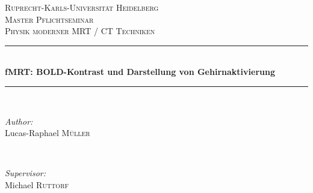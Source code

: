 \begin{titlepage}

\newcommand{\HRule}{\rule{\linewidth}{0.5mm}} %

\center %
 

\textsc{\LARGE Ruprecht-Karls-Universität Heidelberg}\\[1.5cm] %
\textsc{\Large Master Pflichtseminar}\\[0.5cm] %
\textsc{\large Physik moderner MRT / CT Techniken}\\[0.5cm] %


\HRule \\[0.4cm]
{ \huge \bfseries fMRT: BOLD-Kontrast und Darstellung von Gehirnaktivierung}\\[0.4cm] %
\HRule \\[1.5cm]
 

\begin{minipage}{0.4\textwidth}
\begin{flushleft} \large
\emph{Author:}\\
Lucas-Raphael \textsc{Müller} %
\end{flushleft}
\end{minipage}
~
\begin{minipage}{0.4\textwidth}
\begin{flushright} \large
\emph{Supervisor:} \\
Michael \textsc{Ruttorf} %
\end{flushright}
\end{minipage}\\[2cm]



\end{titlepage}

